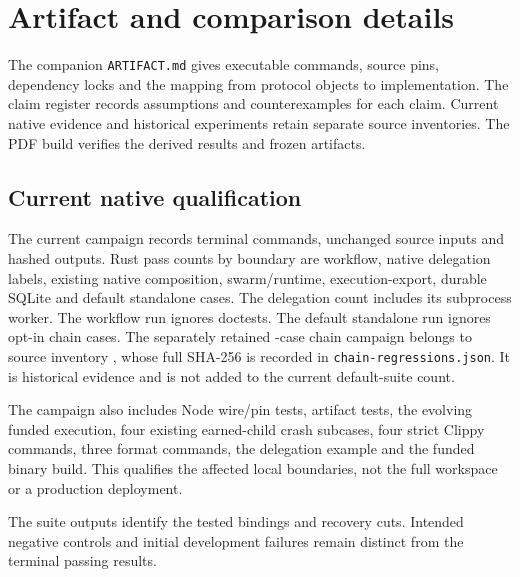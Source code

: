 \section{Artifact and comparison details}
\label{app:evidence}
The companion \texttt{ARTIFACT.md} gives executable commands, source pins,
dependency locks and the mapping from protocol objects to implementation.
The claim register records assumptions and counterexamples for each claim.
Current native evidence and historical experiments retain separate source
inventories. The PDF build verifies the derived results and frozen artifacts.

\subsection{Current native qualification}
The current campaign records \NativeCommands{} terminal commands,
\NativeSources{} unchanged source inputs and \NativeOutputs{} hashed outputs.
Rust pass counts by boundary are \NativeWorkflow{} workflow,
\NativeDelegation{} native delegation labels, \NativeComposition{} existing
native composition, \NativeEvolution{} swarm/runtime,
\NativeExecutionExport{} execution-export, \NativeDurable{} durable SQLite and
\NativeFunded{} default standalone
cases. The delegation count includes its subprocess worker.
The workflow run ignores \NativeWorkflowIgnored{} doctests. The default
standalone run ignores \NativeFundedIgnored{} opt-in chain cases.
The separately retained \HistoricalChainTests{}-case chain campaign belongs to
source inventory \texttt{\HistoricalChainSource}, whose full SHA-256 is recorded in
\texttt{chain-regressions.json}. It is historical evidence and is not added
to the current default-suite count.

The campaign also includes Node wire/pin tests, artifact tests, the evolving
funded execution, four existing earned-child crash subcases, four strict
Clippy commands, three format commands, the delegation example and the funded
binary build. This qualifies the affected local boundaries, not the full
workspace or a production deployment.

The suite outputs identify the tested bindings and recovery cuts. Intended
negative controls and initial development failures remain distinct from the
terminal passing results.


